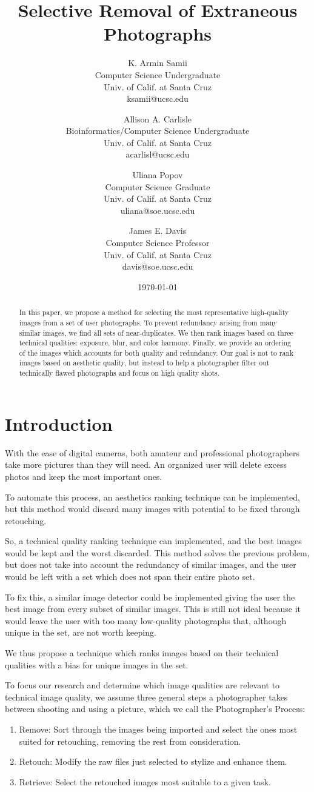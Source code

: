 \documentclass[10pt,twocolumn,letterpaper]{article}
\title{
Selective Removal of Extraneous Photographs
}
\author{
K. Armin Samii\\
Computer Science Undergraduate\\
Univ. of Calif. at Santa Cruz\\
ksamii@ucsc.edu
\and
Allison A. Carlisle\\
Bioinformatics/Computer Science Undergraduate\\
Univ. of Calif. at Santa Cruz\\
acarlisl@ucsc.edu
\and
Uliana Popov\\
Computer Science Graduate\\
Univ. of Calif. at Santa Cruz\\
uliana@soe.ucsc.edu
\and
James E. Davis\\
Computer Science Professor\\
Univ. of Calif. at Santa Cruz\\
davis@soe.ucsc.edu
}
\date{\today}
\begin{document}
\maketitle
\begin{abstract}
In this paper, we propose a method for selecting the most representative high-quality images from a set of user photographs. To prevent redundancy arising from many similar images, we find all sets of near-duplicates. We then rank images based on three technical qualities: exposure, blur, and color harmony. Finally, we provide an ordering of the images which accounts for both quality and redundancy. Our goal is not to rank images based on aesthetic quality, but instead to help a photographer filter out technically flawed photographs and focus on high quality shots.
\end{abstract}

\section{Introduction}
With the ease of digital cameras, both amateur and professional photographers take more pictures than they will need. An organized user will delete excess photos and keep the most important ones.

To automate this process, an aesthetics ranking technique can be implemented, but this method would discard many images with potential to be fixed through retouching.

So, a technical quality ranking technique can implemented, and the best images would be kept and the worst discarded. This method solves the previous problem, but does not take into account the redundancy of similar images, and the user would be left with a set which does not span their entire photo set.

To fix this, a similar image detector could be implemented giving the user the best image from every subset of similar images. This is still not ideal because it would leave the user with too many low-quality photographs that, although unique in the set, are not worth keeping.

We thus propose a technique which ranks images based on their technical qualities with a bias for unique images in the set.

To focus our research and determine which image qualities are relevant to technical image quality, we assume three general steps a photographer takes between shooting and using a picture, which we call the Photographer's Process:
\begin{enumerate}
\item Remove: Sort through the images being imported and select the ones most suited for retouching, removing the rest from consideration.
\item Retouch: Modify the raw files just selected to stylize and enhance them.
\item Retrieve: Select the retouched images most suitable to a given task.
\end{enumerate}
\end{document}
